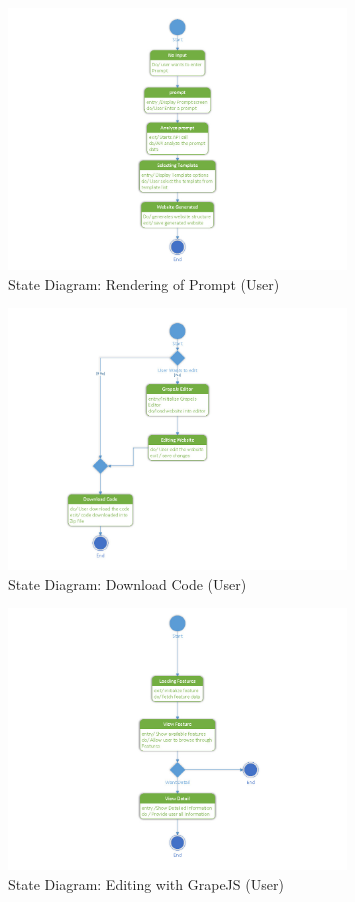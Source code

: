 \documentclass[12pt]{report}
\begin{document}
\begin{figure}[ht]
    \centering
    \includegraphics[width=0.8\textwidth]{Media/Binder2.pdf_Page_17.jpg} %
    \caption{State Diagram: Rendering of Prompt (User)}
    \label{fig:drawing1}
\end{figure}

\begin{figure}[ht]
    \centering
    \includegraphics[width=0.8\textwidth]{Media/Binder2.pdf_Page_18.jpg} %
    \caption{State Diagram: Download Code (User)}
    \label{fig:drawing1}
\end{figure}

\begin{figure}[ht]
    \centering
    \includegraphics[width=0.8\textwidth]{Media/Binder2.pdf_Page_19.jpg} %
    \caption{State Diagram: Editing with GrapeJS (User)}
    \label{fig:drawing1}
\end{figure}
\end{document}
